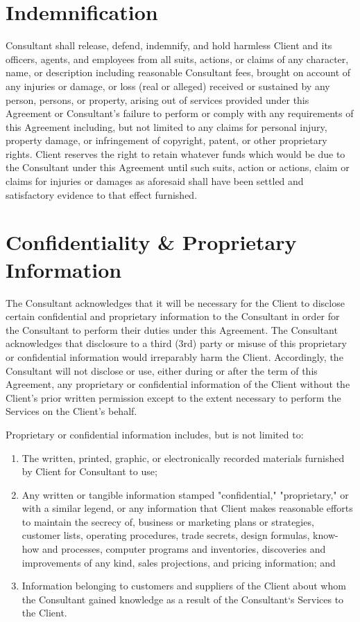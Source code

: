 \documentclass{article}
\begin{document}
\section{Indemnification}

Consultant shall release, defend, indemnify, and hold harmless Client and its officers, agents, and employees from all suits, actions, or claims of any character, name, or description including reasonable Consultant fees, brought on account of any injuries or damage, or loss (real or alleged) received or sustained by any person, persons, or property, arising out of services provided under this Agreement or Consultant's failure to perform or comply with any requirements of this Agreement including, but not limited to any claims for personal injury, property damage, or infringement of copyright, patent, or other proprietary rights. Client reserves the right to retain whatever funds which would be due to the Consultant under this Agreement until such suits, action or actions, claim or claims for injuries or damages as aforesaid shall have been settled and satisfactory evidence to that effect furnished.

\section{Confidentiality \& Proprietary Information}

The Consultant acknowledges that it will be necessary for the Client to disclose certain confidential and proprietary information to the Consultant in order for the Consultant to perform their duties under this Agreement. The Consultant acknowledges that disclosure to a third (3rd) party or misuse of this proprietary or confidential information would irreparably harm the Client. Accordingly, the Consultant will not disclose or use, either during or after the term of this Agreement, any proprietary or confidential information of the Client without the Client's prior written permission except to the extent necessary to perform the Services on the Client's behalf. 

Proprietary or confidential information includes, but is not limited to:
\begin{enumerate}
    \item The written, printed, graphic, or electronically recorded materials furnished by Client for Consultant to use;
    \item Any written or tangible information stamped "confidential," "proprietary," or with a similar legend, or any information that Client makes reasonable efforts to maintain the secrecy of, business or marketing plans or strategies, customer lists, operating procedures, trade secrets, design formulas, know-how and processes, computer programs and inventories, discoveries and improvements of any kind, sales projections, and pricing information; and
    \item  Information belonging to customers and suppliers of the Client about whom the Consultant gained knowledge as a result of the Consultant‘s Services to the Client.
\end{enumerate}
\end{document}
